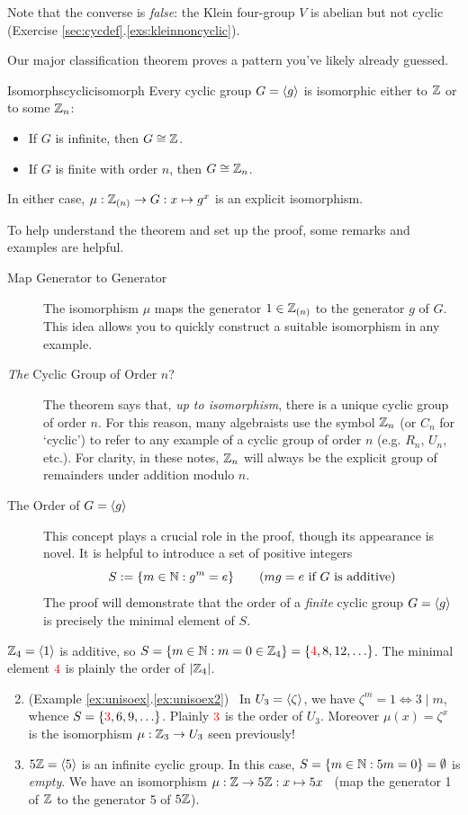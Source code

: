 Note that the converse is \emph{false}: the Klein four-group $V$ is abelian but not cyclic (Exercise \ref*{sec:cycdef}.\ref{exs:kleinnoncyclic}).\medbreak

Our major classification theorem proves a pattern you've likely already guessed.

\begin{thm}{Isomorphs}{cyclicisomorph}
	Every cyclic group $G=\left\langle g\right\rangle$ is isomorphic either to $\mathbb{Z}$ or to some $\mathbb{Z}_n$:
	\begin{itemize}\itemsep0pt
	  \item If $G$ is infinite, then $G\cong\mathbb{Z}$.
	  \item If $G$ is finite with order $n$, then $G\cong\mathbb{Z}_n$.
	\end{itemize}
	In either case, $\mu:\mathbb{Z}_{(n)}\to G:x\mapsto g^x$ is an explicit isomorphism.
\end{thm}

To help understand the theorem and set up the proof, some remarks and examples are helpful.
\begin{description}
  \item[Map Generator to Generator] The isomorphism $\mu$ maps the generator $1\in\mathbb{Z}_{(n)}$ to the generator $g$ of $G$. This idea allows you to quickly construct a suitable isomorphism in any example.
  \item[\emph{The} Cyclic Group of Order $n$?] The theorem says that, \emph{up to isomorphism}, there is a unique cyclic group of order $n$. For this reason, many algebraists use the symbol $\mathbb{Z}_n$ (or $C_n$ for `cyclic') to refer to any example of a cyclic group of order $n$ (e.g. $R_n$, $U_n$, etc.). For clarity, in these notes, $\mathbb{Z}_n$ will always be the explicit group of remainders under addition modulo $n$.
  \item[The Order of $G=\left\langle g\right\rangle$] This concept plays a crucial role in the proof, though its appearance is novel. It is helpful to introduce a set of positive integers
  \[
  	S:=\{m\in\mathbb{N}:g^m=e\} \tag{$mg=e$ if $G$ is additive}
  \]
  The proof will demonstrate that the order of a \emph{finite} cyclic group $G=\left\langle g\right\rangle$ is precisely the minimal element of $S$.
\end{description}


\begin{examples}{}{}
	\exstart $\mathbb{Z}_4=\left\langle 1\right\rangle$ is additive, so $S=\{m\in\mathbb{N}:m=0\in\mathbb{Z}_4\}=\{\textcolor{red}{4},8,12,\ldots\}$. The minimal element $\textcolor{red}{4}$ is plainly the order of $\left| \mathbb{Z}_4\right|$.
	\begin{enumerate}\setcounter{enumi}{1}
	  \item (Example \ref*{ex:unisoex}.\ref{ex:unisoex2}) \ In $U_3=\left\langle \zeta\right\rangle$, we have $\zeta^m=1\Longleftrightarrow 3\mid m$, whence $S=\{\textcolor{red}{3},6,9,\ldots\}$. Plainly $\textcolor{red}{3}$ is the order of $U_3$. Moreover $\mu(x)=\zeta^x$ is the isomorphism $\mu:\mathbb{Z}_3\to U_3$ seen previously!
	  \item $5\mathbb{Z}=\left\langle 5\right\rangle$ is an infinite cyclic group. In this case, $S=\{m\in\mathbb{N}:5m=0\}=\emptyset$ is \emph{empty}. We have an isomorphism $\mu:\mathbb{Z}\to 5\mathbb{Z}:x\mapsto 5x$ \ (map the generator 1 of $\mathbb{Z}$ to the generator 5 of $5\mathbb{Z}$).
	\end{enumerate}
\end{examples}

